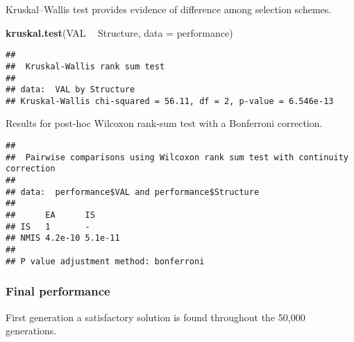 \documentclass[]{book}
\newenvironment{Shaded}{\begin{snugshade}}{\end{snugshade}}
\newcommand{\DataTypeTok}[1]{\textcolor[rgb]{0.13,0.29,0.53}{#1}}
\newcommand{\KeywordTok}[1]{\textcolor[rgb]{0.13,0.29,0.53}{\textbf{#1}}}
\newcommand{\NormalTok}[1]{#1}
\newcommand{\OperatorTok}[1]{\textcolor[rgb]{0.81,0.36,0.00}{\textbf{#1}}}
\newcommand{\OtherTok}[1]{\textcolor[rgb]{0.56,0.35,0.01}{#1}}
\newcommand{\StringTok}[1]{\textcolor[rgb]{0.31,0.60,0.02}{#1}}
\begin{document}
Kruskal--Wallis test provides evidence of difference among selection schemes.

\begin{Shaded}
\begin{Highlighting}[]
\KeywordTok{kruskal.test}\NormalTok{(VAL }\OperatorTok{~}\StringTok{ }\NormalTok{Structure, }\DataTypeTok{data =}\NormalTok{ performance)}
\end{Highlighting}
\end{Shaded}

\begin{verbatim}
## 
##  Kruskal-Wallis rank sum test
## 
## data:  VAL by Structure
## Kruskal-Wallis chi-squared = 56.11, df = 2, p-value = 6.546e-13
\end{verbatim}

Results for post-hoc Wilcoxon rank-sum test with a Bonferroni correction.

\begin{Shaded}
\end{Shaded}

\begin{verbatim}
## 
##  Pairwise comparisons using Wilcoxon rank sum test with continuity correction 
## 
## data:  performance$VAL and performance$Structure 
## 
##      EA      IS     
## IS   1       -      
## NMIS 4.2e-10 5.1e-11
## 
## P value adjustment method: bonferroni
\end{verbatim}

\hypertarget{final-performance-6}{%
\subsubsection{Final performance}\label{final-performance-6}}

First generation a satisfactory solution is found throughout the 50,000 generations.
\end{document}
